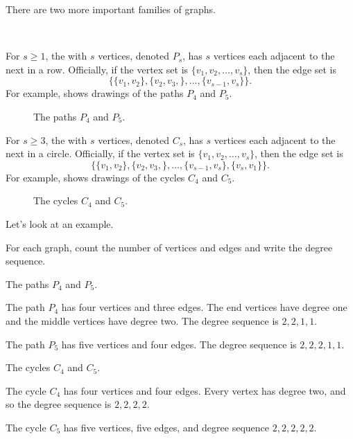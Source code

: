 There are two more important families of graphs.

\begin{defn}
\label{defn_paths_cycles}
~
    \begin{apart}
        \item For $s \ge 1$, the  with $s$ vertices, denoted $P_s$, has $s$ vertices each adjacent to the next in a row.  Officially, if the vertex set is $\{v_1, v_2, \ldots, v_s\}$, then the edge set is $$\{\{v_1,v_2\}, \{v_2,v_3,\}, \ldots, \{v_{s-1},v_s\}\}.$$  For example,  shows drawings of the paths $P_4$ and $P_5$.
            \begin{figure}[ht]
                \centering
                
                \caption{The paths $P_4$ and $P_5$.}
                \label{fig_P4_P5}
            \end{figure}
        
        \item For $s \ge 3$, the  with $s$ vertices, denoted $C_s$, has $s$ vertices each adjacent to the next in a circle.  Officially, if the vertex set is $\{v_1, v_2, \ldots, v_s\}$, then the edge set is $$\{\{v_1,v_2\}, \{v_2,v_3,\}, \ldots, \{v_{s-1},v_s\},\{v_s,v_1\}\}.$$ For example,  shows drawings of the cycles $C_4$ and $C_5$.
            \begin{figure}[htbp]
                \centering
                
                \caption{The cycles $C_4$ and $C_5$.}
                \label{fig_C4_C5}
            \end{figure}
    \end{apart}    
\end{defn}

Let's look at an example.

\begin{exam}
\label{exam_paths_cycles}
    For each graph, count the number of vertices and edges and write the degree sequence.
        \begin{apart}
            \item The paths $P_4$ and $P_5$.
                \begin{soln}
                    The path $P_4$ has four vertices and three edges.  The end vertices have degree one and the middle vertices have degree two.  The degree sequence is $2,2,1,1$. 

                    The path $P_5$ has five vertices and four edges.  The degree sequence is $2,2,2,1,1$. 
                \end{soln}
            \item The cycles $C_4$ and $C_5$.
                \begin{soln}
                    The cycle $C_4$ has four vertices and four edges.  Every vertex has degree two, and so the degree sequence is $2,2,2,2$.

                    The cycle $C_5$ has five vertices, five edges, and degree sequence $2,2,2,2,2$.
                \end{soln} 
        \end{apart}
\end{exam}

